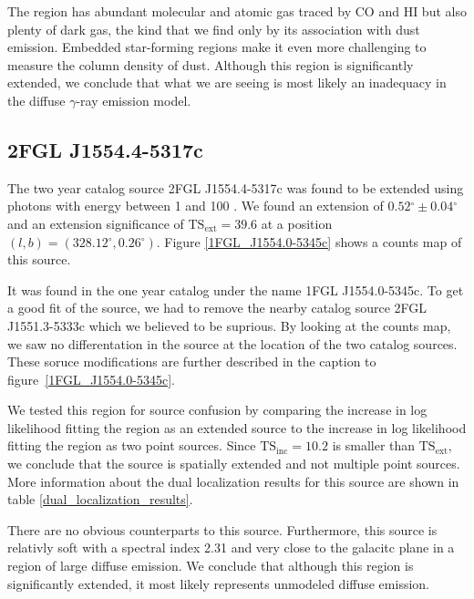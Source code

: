 \documentclass[12pt,preprint]{aastex}
\newcommand{\gev}{\text{GeV}\xspace}
\newcommand{\tsext}{{\ensuremath{\text{TS}_\text{ext}}}\xspace}
\newcommand{\tsinc}{\ensuremath{\text{TS}_\text{inc}}\xspace}
\renewcommand{\deg}{\ensuremath{^\circ}\xspace}
\begin{document}
The region has abundant molecular and atomic gas traced by CO and HI but
also plenty of dark gas, the kind that we find only by its association
with dust emission. Embedded star-forming regions make it even more
challenging to measure the column density of dust.
Although this region is significantly extended, we conclude that what
we are seeing is most likely an inadequacy in the diffuse $\gamma$-ray
emission model.




\subsection{2FGL J1554.4-5317c}


The two year catalog source 2FGL J1554.4-5317c was found to be extended
using photons with energy between 1 \gev and 100 \gev.  We found an
extension of $0.52\deg\pm 0.04\deg$ and an extension significance of
$\tsext=39.6$ at a position $(l,b)=(328.12\deg,0.26\deg)$.  Figure
\ref{1FGL_J1554.0-5345c} shows a counts map of this source.

It was found in the one year catalog under the name 1FGL J1554.0-5345c.
To get a good fit of the source, we had to remove the nearby catalog
source 2FGL J1551.3-5333c which we believed to be suprious. By looking at
the counts map, we saw no differentation in the source at the location
of the two catalog sources. 
These soruce modifications are further described
in the caption to figure~\ref{1FGL_J1554.0-5345c}.

We tested this region for source confusion
by comparing the increase in log likelihood fitting the region as an
extended source to the increase in log likelihood fitting the region
as two point sources. Since $\tsinc=10.2$ is smaller than \tsext, we
conclude that the source is spatially extended and not multiple point
sources. More information about the dual localization results for this
source are shown in table \ref{dual_localization_results}.

There are no obvious counterparts to this source. Furthermore, this
source is relativly soft with a spectral index 2.31 and very close to
the galacitc plane in a region of large diffuse emission.  We conclude
that although this region is significantly extended, it most likely
represents unmodeled diffuse emission.
\end{document}
